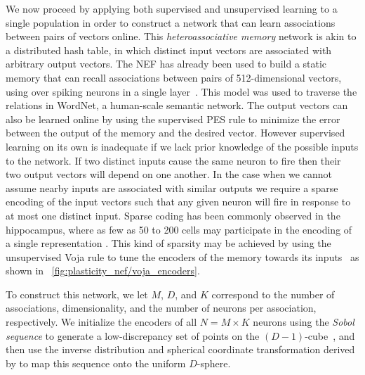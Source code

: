 We now proceed by applying both supervised and unsupervised learning to a single population in order to construct a network that can learn associations between pairs of vectors online.
This {\it heteroassociative memory} network is akin to a distributed hash table, in which distinct input vectors are associated with arbitrary output vectors.
The NEF has already been used to build a static memory that can recall  associations between pairs of 512-dimensional vectors, using over  spiking neurons in a single layer~\citep{crawford2015}.
This model was used to traverse the relations in WordNet, a human-scale semantic network.
The output vectors can also be learned online by using the supervised PES rule to minimize the error between the output of the memory and the desired vector.
However supervised learning on its own is inadequate if we lack prior knowledge of the possible inputs to the network. If two distinct inputs cause the same neuron to fire then their two output vectors will depend on one another.
In the case when we cannot assume nearby inputs are associated with similar outputs we require a sparse encoding of the input vectors such that any given neuron will fire in response to at most one distinct input.
Sparse coding has been commonly observed in the hippocampus, where as few as 50 to 200 cells may participate in the encoding of a single representation \citep{Quiroga2012, Mainetti2015}.
This kind of sparsity may be achieved by using the unsupervised Voja rule to tune the encoders of the memory towards its inputs~\citep{voelker2014a} as shown in \figurename~\ref{fig:plasticity_nef/voja_encoders}.

To construct this network, we let $M$, $D$, and $K$ correspond to the number of associations, dimensionality, and the number of neurons per association, respectively.
We initialize the encoders of all $N = M \times K$ neurons using the {\it Sobol sequence} to generate a low-discrepancy set of points on the $(D-1)$-cube~\citep{Sobol1967}, and then use the inverse distribution and spherical coordinate transformation derived by \citet{fang1994} to map this sequence onto the uniform $D$-sphere.

